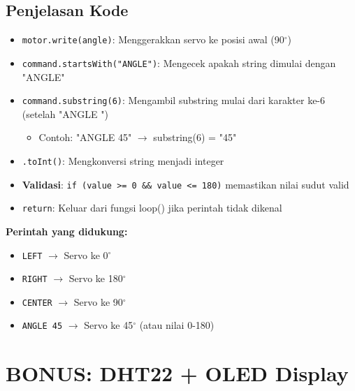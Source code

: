 \documentclass[12pt,a4paper]{article}
\begin{document}
\subsection{Penjelasan Kode}
\begin{itemize}
    \item \texttt{motor.write(angle)}: Menggerakkan servo ke posisi awal (90$^\circ$)
    \item \texttt{command.startsWith("ANGLE")}: Mengecek apakah string dimulai dengan "ANGLE"
    \item \texttt{command.substring(6)}: Mengambil substring mulai dari karakter ke-6 (setelah "ANGLE ")
    \begin{itemize}
        \item Contoh: "ANGLE 45" $\rightarrow$ substring(6) = "45"
    \end{itemize}
    \item \texttt{.toInt()}: Mengkonversi string menjadi integer
    \item \textbf{Validasi}: \texttt{if (value >= 0 \&\& value <= 180)} memastikan nilai sudut valid
    \item \texttt{return}: Keluar dari fungsi loop() jika perintah tidak dikenal
\end{itemize}

\textbf{Perintah yang didukung:}
\begin{itemize}
    \item \texttt{LEFT} $\rightarrow$ Servo ke 0$^\circ$
    \item \texttt{RIGHT} $\rightarrow$ Servo ke 180$^\circ$
    \item \texttt{CENTER} $\rightarrow$ Servo ke 90$^\circ$
    \item \texttt{ANGLE 45} $\rightarrow$ Servo ke 45$^\circ$ (atau nilai 0-180)
\end{itemize}

\newpage
\section{BONUS: DHT22 + OLED Display}
\end{document}
